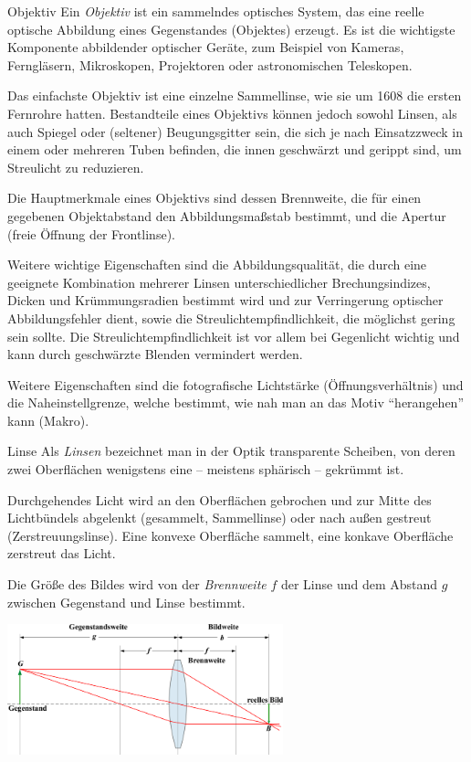 \begin{defi}[Kamera]{Objektiv}
    Ein \emph{Objektiv} ist ein sammelndes optisches System, das eine reelle optische Abbildung eines Gegenstandes (Objektes) erzeugt. Es ist die wichtigste Komponente abbildender optischer Geräte, zum Beispiel von Kameras, Ferngläsern, Mikroskopen, Projektoren oder astronomischen Teleskopen.

    Das einfachste Objektiv ist eine einzelne Sammellinse, wie sie um 1608 die ersten Fernrohre hatten.
    Bestandteile eines Objektivs können jedoch sowohl Linsen, als auch Spiegel oder (seltener) Beugungsgitter sein, die sich je nach Einsatzzweck in einem oder mehreren Tuben befinden, die innen geschwärzt und gerippt sind, um Streulicht zu reduzieren.

    Die Hauptmerkmale eines Objektivs sind dessen Brennweite, die für einen gegebenen Objektabstand den Abbildungsmaßstab bestimmt, und die Apertur (freie Öffnung der Frontlinse).

    Weitere wichtige Eigenschaften sind die Abbildungsqualität, die durch eine geeignete Kombination mehrerer Linsen unterschiedlicher Brechungsindizes, Dicken und Krümmungsradien bestimmt wird und zur Verringerung optischer Abbildungsfehler dient, sowie die Streulichtempfindlichkeit, die möglichst gering sein sollte.
    Die Streulichtempfindlichkeit ist vor allem bei Gegenlicht wichtig und kann durch geschwärzte Blenden vermindert werden.

    Weitere Eigenschaften sind die fotografische Lichtstärke (Öffnungsverhältnis) und die Naheinstellgrenze, welche bestimmt, wie nah man an das Motiv \enquote{herangehen} kann (Makro).
\end{defi}

\begin{defi}[Kamera]{Linse}
    Als \emph{Linsen} bezeichnet man in der Optik transparente Scheiben, von deren zwei Oberflächen wenigstens eine -- meistens sphärisch -- gekrümmt ist.

    Durchgehendes Licht wird an den Oberflächen gebrochen und zur Mitte des Lichtbündels abgelenkt (gesammelt, Sammellinse) oder nach außen gestreut (Zerstreuungslinse).
    Eine konvexe Oberfläche sammelt, eine konkave Oberfläche zerstreut das Licht.

    Die Größe des Bildes wird von der \emph{Brennweite} $f$ der Linse und dem Abstand $g$ zwischen Gegenstand und Linse bestimmt.

    \centering
    \includegraphics[width=0.6\textwidth]{figures/linse.png}
\end{defi}

